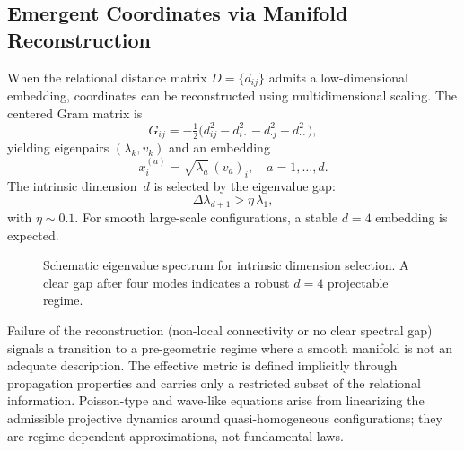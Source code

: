 \subsection{Emergent Coordinates via Manifold Reconstruction}
  \label{subsec:emergent-coordinates}

  When the relational distance matrix $D=\{d_{ij}\}$ admits a
  low-dimensional embedding, coordinates can be reconstructed using
  multidimensional scaling.
  The centered Gram matrix is
  \begin{equation}
    G_{ij} = -\tfrac{1}{2}\Big(
    d_{ij}^2 - d_{i\cdot}^2
    - d_{\cdot j}^2 + d_{\cdot\cdot}^2\Big),
    \label{eq:gram-matrix}
  \end{equation}
  yielding eigenpairs $(\lambda_k, v_k)$ and an embedding
  \begin{equation}
    x_i^{(a)} = \sqrt{\lambda_a}\,(v_a)_i,
    \quad a=1,\dots,d.
    \label{eq:mds-embedding}
  \end{equation}
  The intrinsic dimension~$d$ is selected by the eigenvalue gap:
  \begin{equation}
    \Delta\lambda_{d+1} > \eta\,\lambda_1,
    \label{eq:eigen-gap-criterion}
  \end{equation}
  with $\eta \sim 0.1$.
  For smooth large-scale configurations, a stable $d=4$ embedding is
  expected.

  \begin{figure}[t]
    \centering
    \caption{Schematic eigenvalue spectrum for intrinsic
    dimension selection.
    A clear gap after four modes indicates a robust $d=4$
      projectable regime.}
    \label{fig:eigenvalue-gap}
  \end{figure}

  Failure of the reconstruction (non-local connectivity or no clear
  spectral gap) signals a transition to a pre-geometric regime where a
  smooth manifold is not an adequate description.
  The effective metric is defined implicitly through propagation properties
  and carries only a restricted subset of the relational information.
  Poisson-type and wave-like equations arise from linearizing the
  admissible projective dynamics around quasi-homogeneous configurations;
  they are regime-dependent approximations, not fundamental laws.
